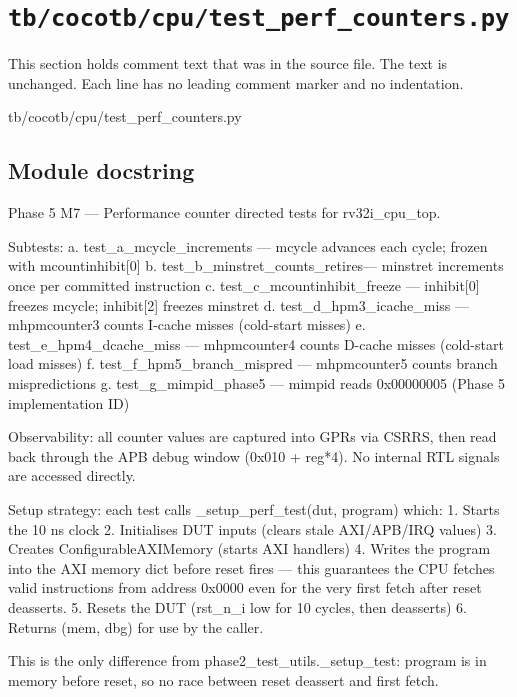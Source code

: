 \section{\texttt{tb/cocotb/cpu/test\_perf\_counters.py}}\label{tm:suite:cpu-test-perf-counters}

This section holds comment text that was in the source file. The text is unchanged. Each line has no leading comment marker and no indentation.

\begin{relocated}{tb/cocotb/cpu/test_perf_counters.py}

\subsection*{Module docstring}

\begin{textblock}
Phase 5 M7 — Performance counter directed tests for rv32i_cpu_top.

Subtests:
a. test_a_mcycle_increments      — mcycle advances each cycle; frozen with mcountinhibit[0]
b. test_b_minstret_counts_retires— minstret increments once per committed instruction
c. test_c_mcountinhibit_freeze   — inhibit[0] freezes mcycle; inhibit[2] freezes minstret
d. test_d_hpm3_icache_miss       — mhpmcounter3 counts I-cache misses (cold-start misses)
e. test_e_hpm4_dcache_miss       — mhpmcounter4 counts D-cache misses (cold-start load misses)
f. test_f_hpm5_branch_mispred    — mhpmcounter5 counts branch mispredictions
g. test_g_mimpid_phase5          — mimpid reads 0x00000005 (Phase 5 implementation ID)

Observability: all counter values are captured into GPRs via CSRRS, then read back through
the APB debug window (0x010 + reg*4). No internal RTL signals are accessed directly.

Setup strategy: each test calls _setup_perf_test(dut, program) which:
1. Starts the 10 ns clock
2. Initialises DUT inputs (clears stale AXI/APB/IRQ values)
3. Creates ConfigurableAXIMemory (starts AXI handlers)
4. Writes the program into the AXI memory dict before reset fires
— this guarantees the CPU fetches valid instructions from address 0x0000
even for the very first fetch after reset deasserts.
5. Resets the DUT (rst_n_i low for 10 cycles, then deasserts)
6. Returns (mem, dbg) for use by the caller.

This is the only difference from phase2_test_utils._setup_test: program is in memory
before reset, so no race between reset deassert and first fetch.
\end{textblock}

\end{relocated}

